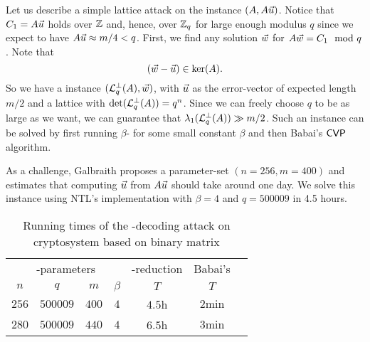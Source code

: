 Let us describe a simple lattice attack on the instance $(A, A \vec u)$. Notice
that $C_1 = A \vec u$ holds over ${{\mathbb Z}}$ and, hence, over ${{\mathbb Z}}_q$ for large enough
modulus $q$ since we expect to have $A \vec u \approx m/4 < q$. First, we find any solution
$\vec w$ for $A \vec w = C_1 \mod q$. Note that
\[(\vec w- \vec u) \in \ker (A).
\]
So
we have a \BDD{} instance $(\mathcal{L}_q^{\perp} (A), \vec w)$, with $\vec u$ as the
error-vector of expected length $m/2$ and a lattice with $\det(\mathcal{L}_q^{\perp}(A))= q^n$.
Since we can freely choose $q$ to be as large as we want, we can guarantee that
$\lambda_1 (\mathcal{L}_q^{\perp}(A)) \gg m/2$. Such an instance can be solved by first
running $\beta$-\BKZ{} for some small constant $\beta$ and then Babai's $\textsf{CVP}$ algorithm.

As a challenge, Galbraith proposes a parameter-set $(n=256, m=400)$ and estimates
that computing $\vec u$ from $A \vec u$ should take around one day.
We solve this instance using NTL's \BKZ{} implementation with $\beta = 4$ and $q
= 500009$ in 4.5 hours.

\vspace{20pt}
\begin{table}[h]
	\centering
	\begin{tabular}{cccc|c|cc}
		\toprule
		\multicolumn{4}{c|}{\LWE-parameters}               & {\BKZ-reduction}  & {Babai's \CVP} \\
		$n$   & $q$          & $m$   & $\beta$ & $T$        &  $T$      \\\midrule
		$256$ & $500009$     & $400$ & $4$     & $4.5$h     & $2 \text{min}$                  \\
		$280$ & $500009$     & $440$ & $4$     & $6.5$h     & $3 \text{min}$                  \\\bottomrule
	\end{tabular}
	\caption{Running times of the \BDD-decoding attack on cryptosystem based on binary matrix \LWE}
	\label{table:RunTimesBinMatrix}
\end{table}